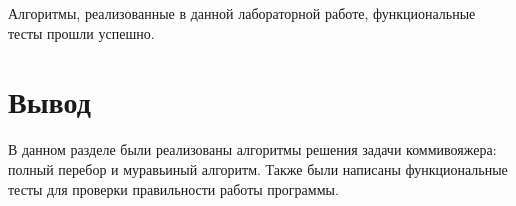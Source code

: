 Алгоритмы, реализованные в данной лабораторной работе, функциональные тесты прошли успешно.


\section*{Вывод}

В данном разделе были реализованы алгоритмы решения задачи коммивояжера: полный
перебор и муравьиный алгоритм. Также были написаны функциональные тесты для проверки правильности 
работы программы.


